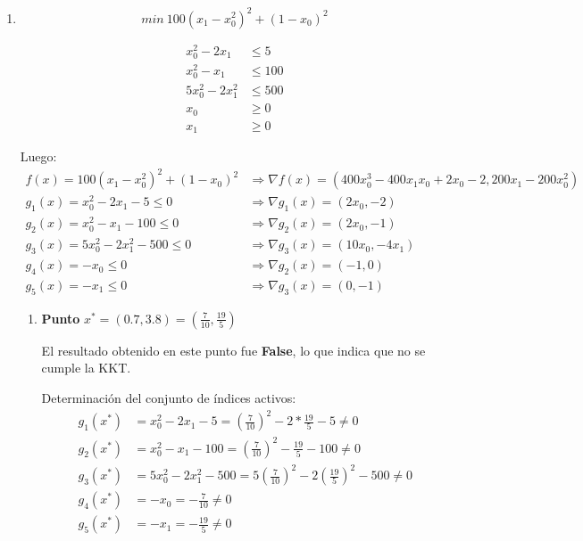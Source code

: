 \documentclass[titlepage, 11pt]{scrartcl}
\begin{document}
\begin{enumerate}
\begin{enumerate}
\begin{enumerate}
			El hecho de que no se cumpla la condición de KKT permite afirmar que o bien el punto no es un m\'inimo local del problema o que no se cumple la LICQ (que no se cumplan ninguna de las dos también podría es una opci\'on); en este caso, s\'i se cumple la condici\'on de regularidad, por tanto el punto $x^*$ no es un m\'inimo local del problema.
		\end{enumerate}
	
	\vspace{1cm}
		\item \begin{equation*}
		min \ 100(x_1 - x_0^2)^2 + (1 - x_0)^2
		\end{equation*}
		
		\begin{align*}
		x_0^2 - 2x_1 &\leq 5\\
		x_0^2 - x_1 &\leq 100\\
		5x_0^2 - 2 x_1^2 &\leq 500\\
		x_0 &\geq 0\\
		x_1 &\geq 0
		\end{align*}
		
		Luego:
		\begin{align*}
		f(x) = 100(x_1 - x_0^2)^2 + (1 - x_0)^2 &\Rightarrow \nabla f(x) = (400 x_0^3 - 400 x_1x_0 + 2x_0 - 2, 200x_1 - 200x_0^2)\\
		g_1(x) = x_0^2 - 2x_1 - 5 \leq 0 &\Rightarrow \nabla g_1(x) = (2 x_0, -2)\\
		g_2(x) = x_0^2 - x_1 - 100 \leq 0 &\Rightarrow \nabla g_2(x) = (2x_0, -1)\\
		g_3(x) = 5x_0^2 - 2 x_1^2 - 500 \leq 0 &\Rightarrow \nabla g_3(x) = (10x_0, -4x_1) \\
		g_4(x) = -x_0 \leq 0 &\Rightarrow \nabla g_2(x) = (-1, 0)\\
		g_5(x) =  -x_1 \leq 0 &\Rightarrow \nabla g_3(x) = (0, -1)
		\end{align*}
			
			
		\vspace{7mm}
		\begin{enumerate}
			\item \textbf{Punto} $x^* = (0.7, 3.8) = (\frac{7}{10}, \frac{19}{5})$
			
			El resultado obtenido en este punto fue \textbf{False}, lo que indica que no se cumple la KKT.
			
			Determinaci\'on del conjunto de \'indices activos:
			\begin{align*}
				g_1(x^*) &= x_0^2 - 2x_1 - 5 = (\frac{7}{10})^2 - 2* \frac{19}{5} - 5 \neq 0\\
				g_2(x^*) &= x_0^2 - x_1 - 100 = (\frac{7}{10})^2 - \frac{19}{5} - 100 \neq 0\\
				g_3(x^*) &= 5x_0^2 - 2 x_1^2 - 500 = 5 (\frac{7}{10})^2 - 2(\frac{19}{5})^2 - 500 \neq 0\\
				g_4(x^*) &= -x_0 = -\frac{7}{10} \neq 0\\
				g_5(x^*) &= -x_1 = -\frac{19}{5} \neq 0
			\end{align*}
			

\end{enumerate}
\end{enumerate}
\end{enumerate}
\end{document}
